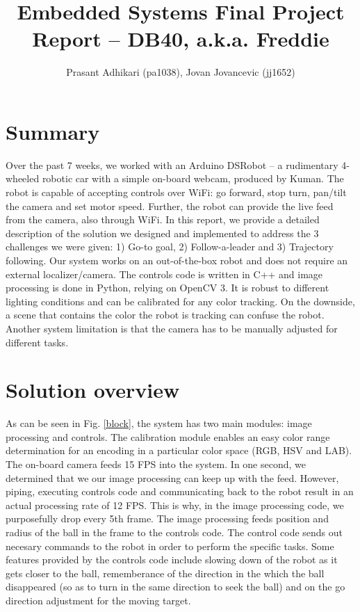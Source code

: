 \documentclass[12pt, twoside, a4paper, titlepage]{article}
\begin{document}
\title{Embedded Systems \linebreak Final Project Report -- DB40, a.k.a. Freddie }
\author{Prasant Adhikari (pa1038), Jovan Jovancevic (jj1652)}
\maketitle

\section{Summary}
Over the past 7 weeks, we worked with an Arduino DSRobot -- a rudimentary 4-wheeled robotic car with a simple on-board webcam, produced by Kuman. The robot is capable of accepting controls over WiFi: go forward, stop turn, pan/tilt the camera and set motor speed. Further, the robot can provide the live feed from the camera, also through WiFi. In this report, we provide a detailed description of the solution we designed and implemented to address the 3 challenges we were given: 1) Go-to goal, 2) Follow-a-leader and 3) Trajectory following. Our system works on an out-of-the-box robot and does not require an external localizer/camera. The controls code is written in C++ and image processing is done in Python, relying on OpenCV 3. It is robust to different lighting conditions and can be calibrated for any color tracking. On the downside, a scene that contains the color the robot is tracking can confuse the robot. Another system limitation is that the camera has to be manually adjusted for different tasks.

\section{Solution overview}
As can be seen in Fig. \ref{block}, the system has two main modules: image processing and controls. The calibration module enables an easy color range determination for an encoding in a particular color space (RGB, HSV and LAB). The on-board camera feeds 15 FPS into the system. In one second, we determined that we our image processing can keep up with the feed. However, piping, executing controls code and communicating back to the robot result in an actual processing rate of 12 FPS. This is why, in the image processing code, we purposefully drop every 5th frame. The image processing feeds position and radius of the ball in the frame to the controls code. The control code sends out necesary commands to the robot in order to perform the specific tasks. Some features provided by the controls code include slowing down of the robot as it gets closer to the ball, rememberance of the direction in the which the ball disappeared (so as to turn in the same direction to seek the ball) and on the go direction adjustment for the moving target. 
\end{document}
